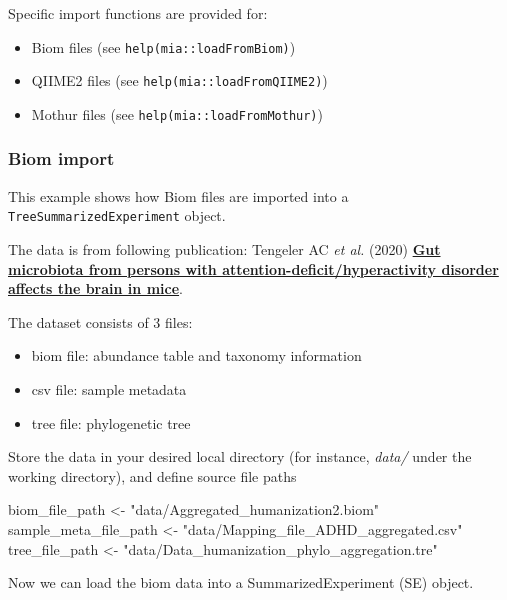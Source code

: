 \documentclass[
]{book}
\newenvironment{Shaded}{\begin{snugshade}}{\end{snugshade}}
\newcommand{\NormalTok}[1]{#1}
\newcommand{\OtherTok}[1]{\textcolor[rgb]{0.56,0.35,0.01}{#1}}
\newcommand{\StringTok}[1]{\textcolor[rgb]{0.31,0.60,0.02}{#1}}
\providecommand{\tightlist}{%
  \setlength{\itemsep}{0pt}\setlength{\parskip}{0pt}}
\begin{document}
Specific import functions are provided for:

\begin{itemize}
\tightlist
\item
  Biom files (see \texttt{help(mia::loadFromBiom)})
\item
  QIIME2 files (see \texttt{help(mia::loadFromQIIME2)})
\item
  Mothur files (see \texttt{help(mia::loadFromMothur)})
\end{itemize}

\hypertarget{biom-import}{%
\subsubsection{Biom import}\label{biom-import}}

This example shows how Biom files are imported into a
\texttt{TreeSummarizedExperiment} object.

The data is from following publication:
Tengeler AC \emph{et al.} (2020) \href{https://doi.org/10.1186/s40168-020-00816-x}{\textbf{Gut microbiota from persons with
attention-deficit/hyperactivity disorder affects the brain in
mice}}.

The dataset consists of 3 files:

\begin{itemize}
\tightlist
\item
  biom file: abundance table and taxonomy information
\item
  csv file: sample metadata
\item
  tree file: phylogenetic tree
\end{itemize}

Store the data in your desired local directory (for instance, \emph{data/} under the
working directory), and define source file paths

\begin{Shaded}
\begin{Highlighting}[]
\NormalTok{biom\_file\_path }\OtherTok{\textless{}{-}} \StringTok{"data/Aggregated\_humanization2.biom"}
\NormalTok{sample\_meta\_file\_path }\OtherTok{\textless{}{-}} \StringTok{"data/Mapping\_file\_ADHD\_aggregated.csv"}
\NormalTok{tree\_file\_path }\OtherTok{\textless{}{-}} \StringTok{"data/Data\_humanization\_phylo\_aggregation.tre"}
\end{Highlighting}
\end{Shaded}

Now we can load the biom data into a SummarizedExperiment (SE) object.
\end{document}
